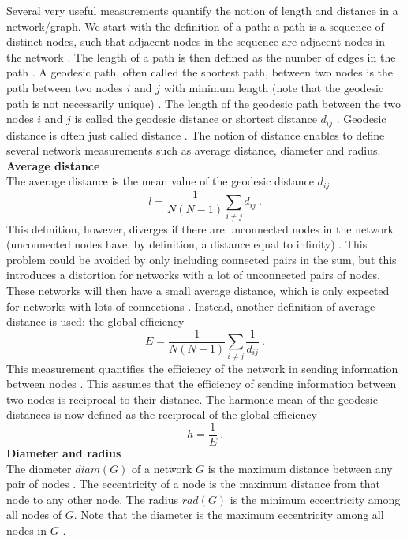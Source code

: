 \documentclass[11 pt , letterpaper , twoside , openright]{book}
\begin{document}
Several very useful measurements quantify the notion of length and distance in a network/graph. We start with the definition of a path: a path is a sequence of distinct nodes, such that adjacent nodes in the sequence are adjacent nodes in the network \cite{Goddard2010}. The length of a path is then defined as the number of edges in the path \cite{Goddard2010}. A geodesic path, often called the shortest path, between two nodes is the path between two nodes $i$ and $j$ with minimum length (note that the geodesic path is not necessarily unique) \cite{F.Costa2007}. The length of the geodesic path between the two nodes $i$ and $j$ is called the geodesic distance or shortest distance $d_{ij}$ \cite{F.Costa2007}. Geodesic distance is often just called distance \cite{Goddard2010}. The notion of distance enables to define several network measurements such as average distance, diameter and radius.\\  
\newline
\textbf{Average distance}\\
\newline
The average distance is the mean value of the geodesic distance $d_{ij}$ \cite{F.Costa2007}
\begin{equation}\label{avdist}
	l = \frac{1}{N(N-1)} \sum_{i \neq j} d_{ij} \ .
\end{equation}
This definition, however, diverges if there are unconnected nodes in the network (unconnected nodes have, by definition, a distance equal to infinity) \cite{F.Costa2007}. This problem could be avoided by only including connected pairs in the sum, but this introduces a distortion for networks with a lot of unconnected pairs of nodes. These networks will then have a small average distance, which is only expected for networks with lots of connections \cite{F.Costa2007}. Instead, another definition of average distance is used: the global efficiency \cite{F.Costa2007}
\begin{equation}
	E = \frac{1}{N(N-1)} \sum_{i \neq j} \frac{1}{d_{ij}} \ .
\end{equation}
This measurement quantifies the efficiency of the network in sending information between nodes \cite{F.Costa2007}. This assumes that the efficiency of sending information between two nodes is reciprocal to their distance. The harmonic mean of the geodesic distances is now defined as the reciprocal of the global efficiency \cite{F.Costa2007}
\begin{equation}
 	h = \frac{1}{E} \ .
\end{equation}
\newline
\textbf{Diameter and radius}\\
\newline
The diameter $diam(G)$ of a network $G$ is the maximum distance between any pair of nodes \cite{Goddard2010}. The eccentricity of a node is the maximum distance from that node to any other node. The radius $rad(G)$ is the minimum eccentricity among all nodes of $G$. Note that the diameter is the maximum eccentricity among all nodes in $G$ \cite{Goddard2010}.
\newpage
\noindent
\end{document}
